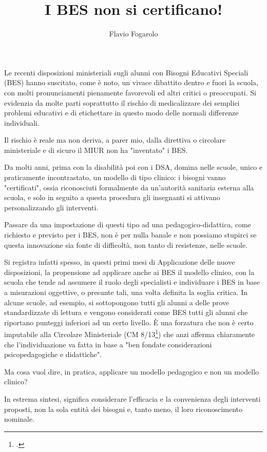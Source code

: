 \author{Flavio Fogarolo}
\title{I BES non si certificano!}
\label{cha:FlavioFogarolo19102013}
\maketitle
{}
Le recenti disposizioni ministeriali sugli alunni con Bisogni Educativi Speciali (BES) hanno suscitato, come è noto, un vivace dibattito dentro e fuori la scuola, con molti pronunciamenti pienamente favorevoli ed altri critici o preoccupati. Si evidenzia da molte parti soprattutto il rischio di medicalizzare dei semplici problemi educativi e di etichettare in questo modo delle normali differenze individuali.

Il rischio è reale ma non deriva, a parer mio, dalla direttiva o circolare ministeriale e di sicuro il MIUR non ha "inventato" i BES.

Da molti anni, prima con la disabilità poi con i DSA, domina nelle scuole, unico e praticamente incontrastato, un modello di tipo clinico: i bisogni vanno "certificati", ossia riconosciuti formalmente da un'autorità sanitaria esterna alla scuola, e solo in seguito a questa procedura gli insegnanti si attivano personalizzando gli interventi.

Passare da una impostazione di questi tipo ad una pedagogico-didattica, come richiesto e previsto per i BES, non è per nulla banale e non possiamo stupirci se questa innovazione sia fonte di difficoltà, non tanto di resistenze, nelle scuole.

Si registra infatti spesso, in questi primi mesi di Applicazione delle nuove disposizioni, la propensione ad applicare anche ai BES il modello clinico, con la scuola che tende ad assumere il ruolo degli specialisti e individuare i BES in base a misurazioni oggettive, o presunte tali, una volta definita la soglia critica. In alcune scuole, ad esempio, si sottopongono tutti gli alunni a delle prove standardizzate di lettura e vengono considerati come BES tutti gli alunni che riportano punteggi inferiori ad un certo livello. È una forzatura che non è certo imputabile alla Circolare Ministeriale (CM 8/13\footcite{cm8_2013}) che anzi afferma chiaramente che l'individuazione va fatta in base a "ben fondate considerazioni psicopedagogiche e didattiche".

Ma cosa vuol dire, in pratica, applicare un modello pedagogico e non un modello clinico?

In estrema sintesi, significa considerare l'efficacia e la convenienza degli interventi proposti, non la sola entità dei bisogni e, tanto meno, il loro riconoscimento nominale.

